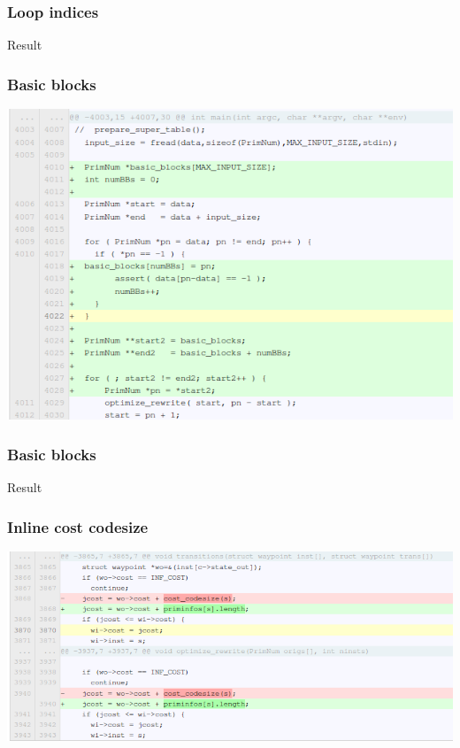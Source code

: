 \documentclass{beamer}
\begin{document}
\begin{frame}\frametitle{Loop indices}
\begin{center}
Result
\end{center}
\end{frame}

\begin{frame}\frametitle{Basic blocks}
\begin{center}
\includegraphics[scale=0.4]{shots/base_block.png}
\end{center}
\end{frame}

\begin{frame}\frametitle{Basic blocks}
\begin{center}
Result
\end{center}
\end{frame}

\begin{frame}\frametitle{Inline cost codesize}
\begin{center}
\includegraphics[scale=0.4]{shots/ccs_inline.png}
\end{center}
\end{frame}
\end{document}

